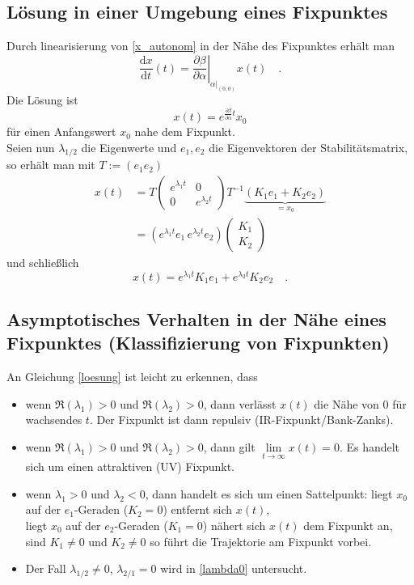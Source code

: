 \documentclass{article}
\renewcommand{\d}{\text{d}}
\begin{document}
  \subsection{Lösung in einer Umgebung eines Fixpunktes}
  Durch linearisierung von \eqref{x_autonom} in der Nähe des Fixpunktes erhält man
  \begin{equation}
   \frac{\d x}{\d t}(t)=\left. \frac{\partial \beta}{\partial \alpha} \right|_{\alpha|_{(0,0)}}x (t) \quad.
  \end{equation}
  Die Lösung ist
  \begin{equation}
   x(t)=e^{\frac{\partial \beta}{\partial \alpha}t} x_0
  \end{equation}
  für einen Anfangswert $x_0$ nahe dem Fixpunkt.\\
  Seien nun $\lambda_{1/2}$ die Eigenwerte und $e_1,e_2$ die Eigenvektoren der Stabilitätsmatrix, so erhält man
  mit $T:=(e_1e_2)$
  \begin{align}
   x(t)&=T{\begin{pmatrix} e^{\lambda_1 t} &0\\0&e^{\lambda_2 t} \end{pmatrix}} T^{-1} \underbrace{( K_1 e_1 +K_2 e_2)}_{=x_0} \\
       &= ( e^{\lambda_1 t} e_1 \,  e^{\lambda_2 t} e_2) \begin{pmatrix} K_1 \\ K_2 \end{pmatrix} 
   \end{align}
   und schließlich 
   \begin{equation}
       x(t)= e^{\lambda_1 t} K_1 e_1 + e^{\lambda_2 t} K_2 e_2 \quad . 
       \label{loesung}
   \end{equation}
   

  
  \subsection{Asymptotisches Verhalten in der Nähe eines Fixpunktes (Klassifizierung von Fixpunkten)} \label{Klassifizierung}
	An Gleichung \eqref{loesung} ist leicht zu erkennen, dass
	\begin{itemize}
	\item wenn $\Re(\lambda_1)>0$ und $\Re(\lambda_2)>0$, dann 
			verlässt $x(t)$ die Nähe von $0$ für wachsendes $t$. Der 
			Fixpunkt ist dann repulsiv (IR-Fixpunkt/Bank-Zanks).
	\item wenn $\Re(\lambda_1)>0$ und $\Re(\lambda_2)>0$, dann gilt
			$\lim\limits_{t\to \infty} x(t) = 0$. Es handelt sich 
			um einen attraktiven (UV) Fixpunkt.
	\item wenn $\lambda_1 >0$ und $\lambda_2 <0$, dann 
			handelt es sich um einen Sattelpunkt:
			liegt $x_0$ auf der $e_1$-Geraden ($K_2=0$) entfernt sich $x(t)$,\\
			liegt $x_0$ auf der $e_2$-Geraden ($K_1=0$) nähert sich $x(t)$ dem 
			Fixpunkt an,
			sind $K_1\neq 0$ und $K_2 \neq 0$ so führt die Trajektorie am 
			Fixpunkt vorbei.
	\item Der Fall $\lambda_{1/2}\neq 0$, $\lambda_{2/1}=0$ wird in \ref{lambda0}
			untersucht.
	\end{itemize}
\end{document}
